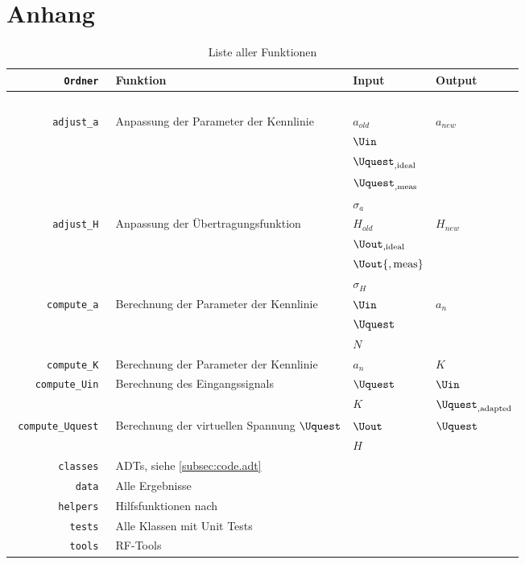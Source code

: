 \documentclass[../Report.tex]{subfiles}
\begin{document}
\chapter{Anhang}
\label{chap:anhang}


\begin{table}[H]
\centering 
\begin{tabular}[t]{| >{\texttt\bgroup}r<{\egroup} | l | l | l |} 
  \hline
    \textrm{\textbf{Ordner}} & \textbf{Funktion} & \textbf{Input} & \textbf{Output} \\ 
  \hline \hline
    \multicolumn{4}{|c|}{blocks} \\
  \hline \hline
  adjust\_a & Anpassung der Parameter der Kennlinie 	& $a_{old}$ & $a_{new}$ \\
  & & $\Uin$ & \\
  & & $\Uquest_{,\textrm{ideal}}$ & \\
  & & $\Uquest_{,\textrm{meas}}$ & \\
  & & $\sigma_a$ & \\
  \hline
  adjust\_H & Anpassung der Übertragungsfunktion 	& $H_{old}$ & $H_{new}$ \\
  & & $\Uout_{,\textrm{ideal}}$ & \\
  & & $\Uout{,\textrm{meas}}$ & \\
  & & $\sigma_H$ & \\
  \hline
  compute\_a & Berechnung der Parameter der Kennlinie 	& $\Uin$ & $a_n$ \\
  & & $\Uquest$ & \\
  & & $N$ & \\
  \hline
  compute\_K & Berechnung der Parameter der Kennlinie 	& $a_n$ & $K$ \\
  \hline
  compute\_Uin & Berechnung des Eingangssignals		 	& $\Uquest$ & $\Uin$ \\
  & & $K$ & $\Uquest_{,\textrm{adapted}}$ \\
  \hline
  compute\_Uquest & Berechnung der virtuellen Spannung $\Uquest$ & $\Uout$ & $\Uquest$ \\
  & & $H$ & \\
  \hline
  
  
  
  \hline \hline
    classes & ADTs, siehe \ref{subsec:code.adt} \\  
  \hline \hline
    data & Alle Ergebnisse \\ 
  \hline
    helpers & Hilfsfunktionen nach \cite{helper_class} 	\\
  \hline 
    tests & Alle Klassen mit Unit Tests \\  
  \hline 
    tools & RF-Tools \\ 
  \hline
\end{tabular}
\caption{Liste aller Funktionen}
\label{tab:anhang.Funktionen}
\end{table}
\end{document}
